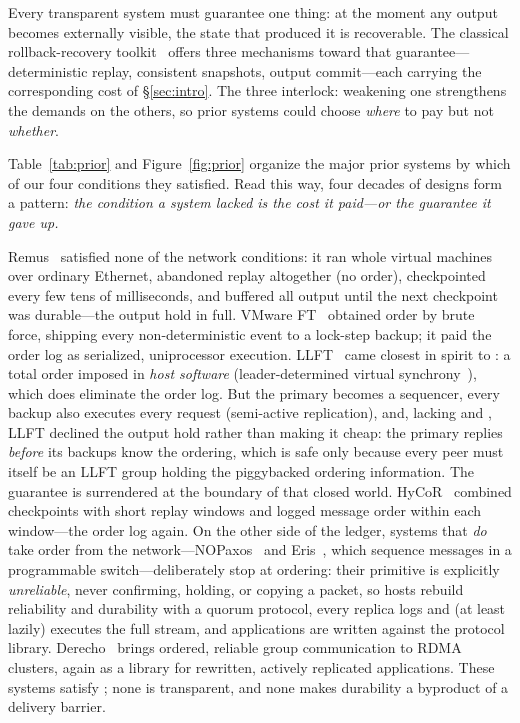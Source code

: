 Every transparent system must guarantee one thing: at the moment any
output becomes externally visible, the state that produced it is
recoverable. The classical rollback-recovery
toolkit~\citep{elnozahy2002survey} offers three mechanisms toward that
guarantee---deterministic replay, consistent snapshots, output
commit---each carrying the corresponding cost of \S\ref{sec:intro}. The
three interlock: weakening one strengthens the demands on the others, so
prior systems could choose \emph{where} to pay but not \emph{whether}.

Table~\ref{tab:prior} and Figure~\ref{fig:prior} organize the major
prior systems by which of our four conditions they satisfied. Read
this way, four decades of designs form a pattern: \emph{the condition a
system lacked is the cost it paid---or the guarantee it gave up.}

Remus~\citep{cully2008remus} satisfied none of the network conditions: it
ran whole virtual machines over ordinary Ethernet, abandoned replay
altogether (no order), checkpointed every few tens of milliseconds, and
buffered all output until the next checkpoint was durable---the output
hold in full. VMware FT~\citep{scales2010vmwareft} obtained order by brute
force, shipping every non-deterministic event to a lock-step backup; it
paid the order log as serialized, uniprocessor execution.
LLFT~\citep{zhao2013llft} came closest in spirit to \Order: a total order
imposed in \emph{host software} (leader-determined virtual
synchrony~\citep{birman1987isis}), which does eliminate the order log. But
the primary becomes a sequencer, every backup also executes every request
(semi-active replication), and, lacking \Barrier and \Durability, LLFT
declined the output hold rather than making it cheap: the primary replies
\emph{before} its backups know the ordering, which is safe only because
every peer must itself be an LLFT group holding the piggybacked ordering
information. The guarantee is surrendered at the boundary of that closed
world. HyCoR~\citep{zhou2021hycor} combined checkpoints with short replay
windows and logged message order within each window---the order log again.
On the other side of the ledger, systems that \emph{do} take order from
the network---NOPaxos~\citep{li2016nopaxos} and Eris~\citep{li2017eris},
which sequence messages in a programmable switch---deliberately stop at
ordering: their primitive is explicitly \emph{unreliable}, never
confirming, holding, or copying a packet, so hosts rebuild reliability and
durability with a quorum protocol, every replica logs and (at least
lazily) executes the full stream, and applications are written against the
protocol library. Derecho~\citep{jha2019derecho} brings ordered, reliable
group communication to RDMA clusters, again as a library for rewritten,
actively replicated applications. These systems satisfy \Order; none is
transparent, and none makes durability a byproduct of a delivery barrier.

